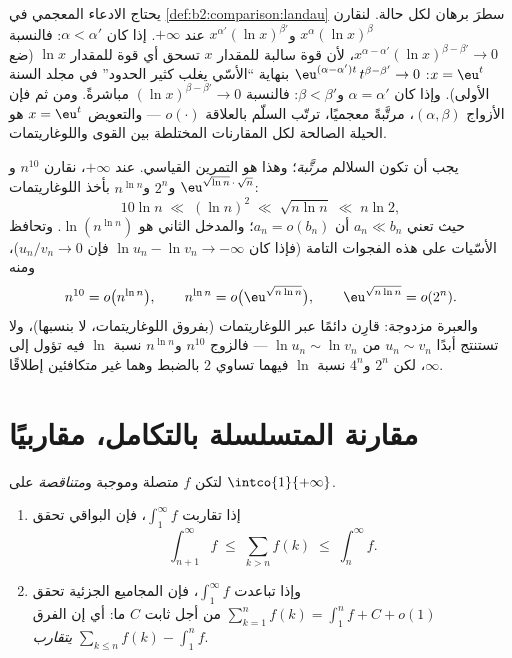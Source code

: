 \begin{example}\label{ex:b2:comparison:scaleorder}
يحتاج الادعاء المعجمي في \cref{def:b2:comparison:landau}
سطرَ برهان لكل حالة. لنقارن
$x^{\alpha}(\ln x)^{\beta}$ و$x^{\alpha'}(\ln x)^{\beta'}$
عند $+\infty$. إذا كان $\alpha < \alpha'$: فالنسبة
$x^{\alpha - \alpha'}(\ln x)^{\beta - \beta'} \to 0$، لأن
قوة سالبة للمقدار $x$ تسحق أي قوة للمقدار $\ln x$ (ضع $x =
\eu^t$: $\eu^{(\alpha - \alpha')t}\,t^{\beta - \beta'} \to 0$
بنهاية ``الأسّي يغلب كثير الحدود'' في مجلد السنة
الأولى). وإذا كان $\alpha = \alpha'$ و$\beta < \beta'$: فالنسبة
$(\ln x)^{\beta - \beta'} \to 0$ مباشرةً. ومن ثم فإن الأزواج
$(\alpha, \beta)$، مرتَّبةً معجميًا، ترتّب السلّم
بالعلاقة $o(\cdot)$ --- والتعويض $x = \eu^t$ هو
الحيلة الصالحة لكل المقارنات المختلطة بين القوى واللوغاريتمات.
\end{example}

\begin{example}\label{ex:b2:comparison:ranking}
يجب أن تكون السلالم \emph{مرتَّبة}؛ وهذا هو التمرين القياسي. عند
$+\infty$، نقارن $n^{10}$ و$\eu^{\sqrt{\ln n}\,\cdot\,\sqrt n}$
و$2^n$ و$n^{\ln n}$ بأخذ اللوغاريتمات:
\[
10\ln n
\;\ll\; (\ln n)^2
\;\ll\; \sqrt{n\ln n}
\;\ll\; n\ln 2 ,
\]
حيث تعني $a_n \ll b_n$ أن $a_n = o(b_n)$؛ والمدخل الثاني
هو $\ln(n^{\ln n})$. وتحافظ الأسّيات على هذه الفجوات التامة (فإذا كان
$\ln u_n - \ln v_n \to -\infty$ فإن $u_n/v_n \to 0$)، ومنه
\[
n^{10} = o\bigl(n^{\ln n}\bigr),
\qquad
n^{\ln n} = o\bigl(\eu^{\sqrt{n\ln n}}\bigr),
\qquad
\eu^{\sqrt{n\ln n}} = o(2^n) .
\]
والعبرة مزدوجة: قارِن دائمًا عبر اللوغاريتمات
(بفروق اللوغاريتمات، لا بنسبها)، ولا تستنتج أبدًا
$u_n \sim v_n$ من $\ln u_n \sim \ln v_n$ --- فالزوج $n^{10}$
و$n^{\ln n}$ نسبة $\ln$ فيه تؤول إلى $\infty$، لكن $2^n$
و$4^n$ نسبة $\ln$ فيهما تساوي $2$ بالضبط وهما غير
متكافئين إطلاقًا.
\end{example}

\section{مقارنة المتسلسلة بالتكامل، مقاربيًا}

\begin{theorem}\label{thm:b2:comparison:seriesintegral}
لتكن $f$ متصلة وموجبة و\emph{متناقصة} على
$\intco{1}{+\infty}$.
\begin{enumerate}
  \item إذا تقاربت $\int_1^{\infty} f$، فإن البواقي تحقق
        \[
        \int_{n+1}^{\infty} f \;\leq\; \sum_{k > n} f(k) \;\leq\;
        \int_{n}^{\infty} f .
        \]
  \item وإذا تباعدت $\int_1^\infty f$، فإن المجاميع الجزئية تحقق
        $\sum_{k=1}^{n} f(k) = \int_1^n f + C + o(1)$ من أجل ثابت
        $C$ ما: أي إن الفرق $\sum_{k \leq n} f(k) -
        \int_1^n f$ \emph{يتقارب}.
\end{enumerate}
\end{theorem}

